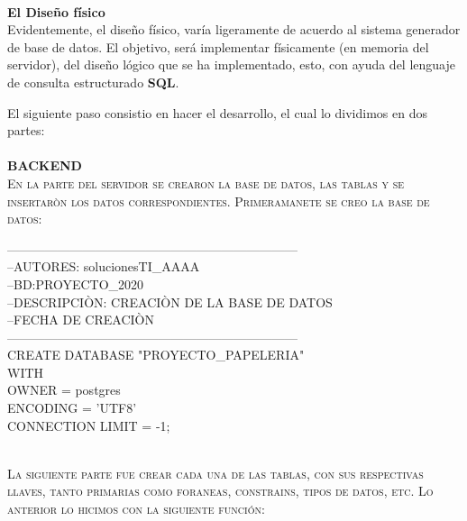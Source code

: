 \documentclass[10pt]{report}
\begin{document}
\textbf{\\El Diseño físico\\}
\setlength{\parskip}{0mm}
Evidentemente, el diseño físico, varía ligeramente de acuerdo al sistema generador de base de datos. El objetivo, será implementar físicamente  (en memoria del servidor), del diseño lógico que se ha implementado, esto, con ayuda del lenguaje de consulta estructurado \textbf{SQL}. 






     El siguiente paso consistio en hacer el desarrollo, el cual lo dividimos en dos partes:\\ \\
    
    {\textbf{BACKEND}} \\
    
    {\large{\textsc {En la parte del servidor se crearon la base de
    datos, las tablas y se insertaròn los datos correspondientes. Primeramanete se creo la base de datos:}}}
    
            \begin{flushleft} \ttfamily
            ---------------------------------------------------------------------\\
            --AUTORES: solucionesTI\_AAAA\\
            --BD:PROYECTO\_2020 \\
            --DESCRIPCIÒN: CREACIÒN DE LA BASE DE DATOS\\
            --FECHA DE CREACIÒN \\
            ---------------------------------------------------------------------\\
            CREATE DATABASE "PROYECTO\_PAPELERIA"\\
            WITH \\
            OWNER = postgres\\
            ENCODING = 'UTF8'\\
            CONNECTION LIMIT = -1;\\
            \end{flushleft} 
            
            
 {\large{\textsc{\\La siguiente parte fue crear cada una de las tablas, con sus respectivas llaves, tanto primarias como foraneas, constrains, tipos de datos, etc. Lo anterior lo hicimos con la siguiente función:\\}}}
  
\end{document}
